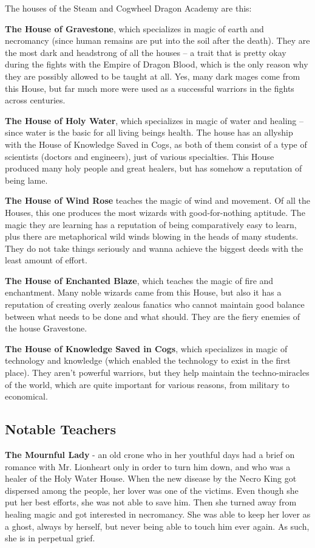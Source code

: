\documentclass[a4paper,11pt]{article}
\begin{document}
The houses of the Steam and Cogwheel Dragon Academy are this:

\textbf{The House of Gravestone}, which specializes in magic of earth and necromancy (since human remains are put into the soil after the death). They are the most dark and headstrong of all the houses – a trait that is pretty okay during the fights with the Empire of Dragon Blood, which is the only reason why they are possibly allowed to be taught at all. Yes, many dark mages come from this House, but far much more were used as a successful warriors in the fights across centuries.

\textbf{The House of Holy Water}, which specializes in magic of water and healing – since water is the basic for all living beings health. The house has an allyship with the House of Knowledge Saved in Cogs, as both of them consist of a type of scientists (doctors and engineers), just of various specialties. This House produced many holy people and great healers, but has somehow a reputation of being lame.

\textbf{The House of Wind Rose} teaches the magic of wind and movement. Of all the Houses, this one produces the most wizards with good-for-nothing aptitude. The magic they are learning has a reputation of being comparatively easy to learn, plus there are metaphorical wild winds blowing in the heads of many students. They do not take things seriously and wanna achieve the biggest deeds with the least amount of effort. 

\textbf{The House of Enchanted Blaze}, which teaches the magic of fire and enchantment. Many noble wizards came from this House, but also it has a reputation of creating overly zealous fanatics who cannot maintain good balance between what needs to be done and what should. They are the fiery enemies of the house Gravestone.

\textbf{The House of Knowledge Saved in Cogs}, which specializes in magic of technology and knowledge (which enabled the technology to exist in the first place). They aren’t powerful warriors, but they help maintain the techno-miracles of the world, which are quite important for various reasons, from military to economical.

\subsection{Notable Teachers}

\textbf{The Mournful Lady} - an old crone who in her youthful days had a brief on romance with Mr. Lionheart only in order to turn him down, and who was a healer of the Holy Water House. When the new disease by the Necro King got dispersed among the people, her lover was one of the victims. Even though she put her best efforts, she was not able to save him. Then she turned away from healing magic and got interested in necromancy. She was able to keep her lover as a ghost, always by herself, but never being able to touch him ever again. As such, she is in perpetual grief.
\end{document}
